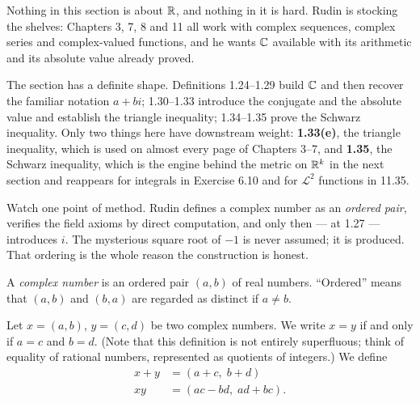 
\begin{signpost}
Nothing in this section is about $\mathbb{R}$, and nothing in it is hard. Rudin is
stocking the shelves: Chapters 3, 7, 8 and 11 all work with complex sequences,
complex series and complex-valued functions, and he wants $\mathbb{C}$ available with
its arithmetic and its absolute value already proved.

\smallskip
The section has a definite shape. Definitions 1.24--1.29 build $\mathbb{C}$ and then
recover the familiar notation $a+bi$; 1.30--1.33 introduce the conjugate and the
absolute value and establish the triangle inequality; 1.34--1.35 prove the
Schwarz inequality. Only two things here have downstream weight: \textbf{1.33(e)},
the triangle inequality, which is used on almost every page of Chapters 3--7,
and \textbf{1.35}, the Schwarz inequality, which is the engine behind the metric
on $\mathbb{R}^k$ in the next section and reappears for integrals in Exercise 6.10 and
for $\mathscr{L}^2$ functions in 11.35.

\smallskip
Watch one point of method. Rudin defines a complex number as an \emph{ordered
pair}, verifies the field axioms by direct computation, and only then --- at
1.27 --- introduces $i$. The mysterious square root of $-1$ is never assumed; it
is produced. That ordering is the whole reason the construction is honest.
\end{signpost}

A \emph{complex number} is an ordered pair $(a,b)$ of real numbers. ``Ordered''
means that $(a,b)$ and $(b,a)$ are regarded as distinct if $a \ne b$.

Let $x = (a,b)$, $y = (c,d)$ be two complex numbers. We write $x = y$ if and
only if $a = c$ and $b = d$. (Note that this definition is not entirely
superfluous; think of equality of rational numbers, represented as quotients of
integers.) We define
\begin{align*}
  x + y &= (a+c,\; b+d)\\
  xy &= (ac-bd,\; ad+bc).
\end{align*}

